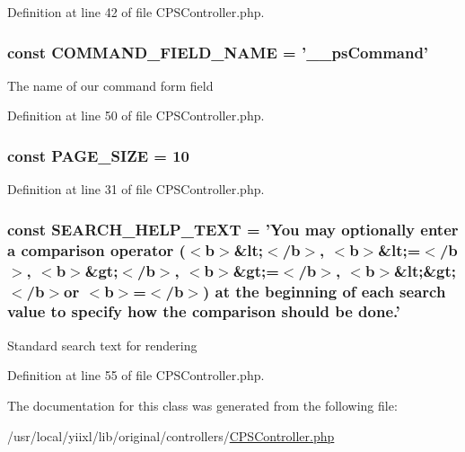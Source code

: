 Definition at line 42 of file CPSController.php.

\hypertarget{classCPSController_acfa3d37fd2964302d32a8905a102196d}{
\subsubsection[{COMMAND\_\-FIELD\_\-NAME}]{\setlength{\rightskip}{0pt plus 5cm}const {\bf COMMAND\_\-FIELD\_\-NAME} = '\_\-\_\-psCommand'}}
\label{classCPSController_acfa3d37fd2964302d32a8905a102196d}
The name of our command form field 

Definition at line 50 of file CPSController.php.

\hypertarget{classCPSController_a4634a091c35db33009455321e1d259e3}{
\subsubsection[{PAGE\_\-SIZE}]{\setlength{\rightskip}{0pt plus 5cm}const {\bf PAGE\_\-SIZE} = 10}}
\label{classCPSController_a4634a091c35db33009455321e1d259e3}


Definition at line 31 of file CPSController.php.

\hypertarget{classCPSController_a21930d5a45a39f983d1b157fd28819dc}{
\subsubsection[{SEARCH\_\-HELP\_\-TEXT}]{\setlength{\rightskip}{0pt plus 5cm}const {\bf SEARCH\_\-HELP\_\-TEXT} = 'You may optionally enter a comparison operator ($<$b$>$\&lt;$<$/b$>$, $<$b$>$\&lt;=$<$/b$>$, $<$b$>$\&gt;$<$/b$>$, $<$b$>$\&gt;=$<$/b$>$, $<$b$>$\&lt;\&gt;$<$/b$>$or $<$b$>$=$<$/b$>$) at the beginning of each search value to specify how the comparison should be done.'}}
\label{classCPSController_a21930d5a45a39f983d1b157fd28819dc}
Standard search text for rendering 

Definition at line 55 of file CPSController.php.



The documentation for this class was generated from the following file:\begin{DoxyCompactItemize}
\item 
/usr/local/yiixl/lib/original/controllers/\hyperlink{CPSController_8php}{CPSController.php}\end{DoxyCompactItemize}
